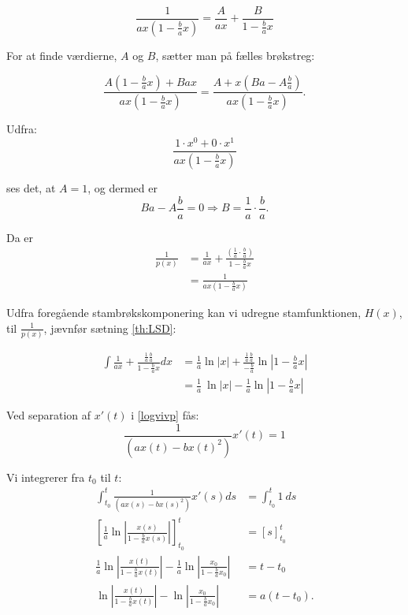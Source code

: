 \begin{equation*}
    \frac{1}{ax(1-\frac{b}{a}x)}=\frac{A}{ax}+\frac{B}{1-\frac{b}{a}x}
\end{equation*}

For at finde værdierne, $A$ og $B$, sætter man på fælles brøkstreg:

\begin{equation*}
    \frac{A \left(1- \frac{b}{a}x \right)+Bax}{ax \left(1- \frac{b}{a}x \right)} =\frac{A + x \left( Ba-A \frac{b}{a} \right)}{ax \left(1-\frac{b}{a}x \right)}.
\end{equation*}

Udfra:
\begin{equation*}
\frac{1\cdot x^0+0\cdot x^1}{ax(1-\frac{b}{a}x)}
\end{equation*}

ses det, at $A=1$, og dermed er 
\begin{equation*}
    Ba - A \frac{b}{a} = 0 \Rightarrow B = \frac{1}{a} \cdot \frac{b}{a}.   
\end{equation*}

Da er 
\begin{align*}
    \frac{1}{p(x)} &= \frac{1}{ax}+\frac{\left( \frac{1}{a} \cdot \frac{b}{a} \right)}{1-\frac{b}{a}x} \\
    &= \frac{1}{ax \left( 1-\frac{b}{a}x \right)}
\end{align*}

Udfra foregående stambrøkskomponering kan vi udregne stamfunktionen, $H(x)$, til $\frac{1}{p(x)}$, jævnfør sætning \ref{th:LSD}:

\begin{align*}
    \int \frac{1}{ax}+\frac{ \frac{1}{a} \frac{b}{a}}{1-\frac{b}{a}x}dx
    &=\frac{1}{a}\ln|x|+\frac{\frac{1}{a}\frac{b}{a}}{-\frac{b}{a}}\ln \left|1-\frac{b}{a}x\right|\\
    &=\frac{1}{a}\ \ln|x|-\frac{1}{a}\ln \left|1-\frac{b}{a}x\right|
\end{align*}

Ved separation af $x'(t)$ i \eqref{logvivp} fås:
\begin{equation*}
    \frac{1}{(ax(t)-bx(t)^2)} x'(t)= 1   
\end{equation*}

Vi integrerer fra $t_0$ til $t$:
\begin{align*}
    \int^t_{t_0} \frac{1}{(ax(s)-bx(s)^2)} x'(s)ds&=\int^{t}_{t_0}1\ ds\\
    \left[ \frac{1}{a} \ln \left| \frac{x(s)}{1-\frac{b}{a}x(s)} \right| \right]^t_{t_0}&=[s]^t_{t_0}\\
    \frac{1}{a}\ln \left|\frac{x(t)}{1-\frac{b}{a}x(t)} \right|-\frac{1}{a}\ln \left| \frac{
    x_0}{1-\frac{b}{a}x_0} \right|&=t-t_0\\
    \ln \left| \frac{x(t)}{1-\frac{b}{a}x(t)}\right|-\ln \left|\frac{x_0}{1-\frac{b}{a}x_0}\right| &=a(t-t_0).
\end{align*}

